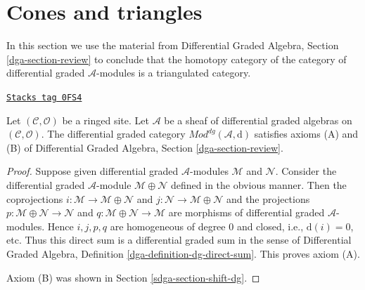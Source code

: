 \section{Cones and triangles}
\label{sdga-section-conclude-triangulated}
In this section we use the material from
Differential Graded Algebra, Section \ref{dga-section-review}
to conclude that the homotopy category of the
category of differential graded $\mathcal{A}$-modules
is a triangulated category.

\begin{lemma}[Axioms AB]
\label{sdga-lemma-axioms-AB}
\href{https://stacks.math.columbia.edu/tag/0FS4}{\texttt{Stacks tag 0FS4}}

Let $(\mathcal{C}, \mathcal{O})$ be a ringed site.
Let $\mathcal{A}$ be a sheaf of differential graded algebras
on $(\mathcal{C}, \mathcal{O})$.
The differential graded category
$\textit{Mod}^{dg}(\mathcal{A}, \text{d})$
satisfies axioms (A) and (B) of
Differential Graded Algebra, Section \ref{dga-section-review}.
\end{lemma}

\begin{proof}
Suppose given differential graded $\mathcal{A}$-modules
$\mathcal{M}$ and $\mathcal{N}$. Consider the
differential graded $\mathcal{A}$-module $\mathcal{M} \oplus \mathcal{N}$
defined in the obvious manner. Then the coprojections
$i : \mathcal{M} \to \mathcal{M} \oplus \mathcal{N}$ and
$j : \mathcal{N} \to \mathcal{M} \oplus \mathcal{N}$ and the
projections
$p : \mathcal{M} \oplus \mathcal{N} \to \mathcal{N}$ and
$q : \mathcal{M} \oplus \mathcal{N} \to \mathcal{M}$
are morphisms of differential graded $\mathcal{A}$-modules.
Hence $i, j, p, q$ are homogeneous
of degree $0$ and closed, i.e., $\text{d}(i) = 0$, etc.
Thus this direct sum is a differential graded sum in the sense of
Differential Graded Algebra, Definition \ref{dga-definition-dg-direct-sum}.
This proves axiom (A).

\medskip\noindent
Axiom (B) was shown in Section \ref{sdga-section-shift-dg}.
\end{proof}

